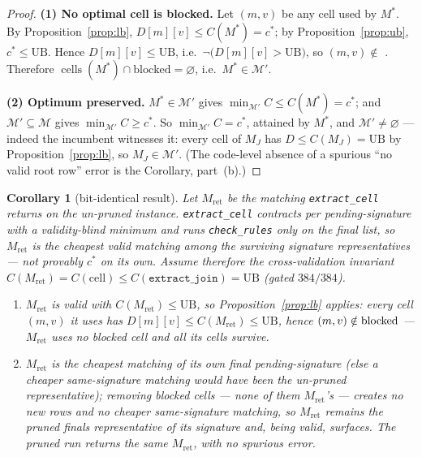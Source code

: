 \documentclass[11pt]{article}
\newtheorem{corollary}{Corollary}
\DeclareMathOperator{\cells}{cells}
\newcommand{\Mcal}{\mathcal{M}}
\newcommand{\cst}{c^{\ast}}
\newcommand{\Mst}{M^{\ast}}
\begin{document}
\begin{proof}
\textbf{(1) No optimal cell is blocked.} Let $(m,v)$ be any cell used by $\Mst$. By
Proposition~\ref{prop:lb}, $D[m][v]\le C(\Mst)=\cst$; by Proposition~\ref{prop:ub}, $\cst\le\mathrm{UB}$.
Hence $D[m][v]\le\mathrm{UB}$, i.e.\ $\neg\bigl(D[m][v]>\mathrm{UB}\bigr)$, so $(m,v)\notin$
. Therefore $\cells(\Mst)\cap\text{blocked}=\varnothing$, i.e.\ $\Mst\in\Mcal'$.

\smallskip
\textbf{(2) Optimum preserved.} $\Mst\in\Mcal'$ gives $\min_{\Mcal'}C\le C(\Mst)=\cst$; and
$\Mcal'\subseteq\Mcal$ gives $\min_{\Mcal'}C\ge\cst$. So $\min_{\Mcal'}C=\cst$, attained by $\Mst$, and
$\Mcal'\ne\varnothing$ --- indeed the incumbent witnesses it: every cell of $M_J$ has
$D\le C(M_J)=\mathrm{UB}$ by Proposition~\ref{prop:lb}, so $M_J\in\Mcal'$. (The code-level absence of a
spurious ``no valid root row'' error is the Corollary, part~(b).) \qedhere
\end{proof}

\begin{corollary}[bit-identical result]
Let $M_{\mathrm{ret}}$ be the matching \texttt{extract\_cell} returns on the un-pruned instance.
\texttt{extract\_cell} contracts per pending-signature with a \emph{validity-blind} minimum and runs
\texttt{check\_rules} only on the final list, so $M_{\mathrm{ret}}$ is the cheapest \emph{valid} matching
among the surviving signature representatives --- \emph{not} provably $\cst$ on its own. Assume therefore
the cross-validation invariant
$C(M_{\mathrm{ret}})=C(\mathrm{cell})\le C(\texttt{extract\_join})=\mathrm{UB}$ (gated $384/384$).
\begin{enumerate}[label=(\alph*),nosep]
  \item $M_{\mathrm{ret}}$ is valid with $C(M_{\mathrm{ret}})\le\mathrm{UB}$, so
        Proposition~\ref{prop:lb} applies: every cell $(m,v)$ it uses has
        $D[m][v]\le C(M_{\mathrm{ret}})\le\mathrm{UB}$, hence $(m,v)\notin\text{\normalfont blocked}$
        --- $M_{\mathrm{ret}}$ uses no blocked cell and all its cells survive.
  \item $M_{\mathrm{ret}}$ is the cheapest matching of its own final pending-signature (else a cheaper
        same-signature matching would have been the un-pruned representative); removing blocked cells ---
        none of them $M_{\mathrm{ret}}$'s --- creates no new rows and no cheaper same-signature matching,
        so $M_{\mathrm{ret}}$ remains the pruned finals representative of its signature and, being valid,
        surfaces. The pruned run returns the \emph{same} $M_{\mathrm{ret}}$, with no spurious error.
\end{enumerate}
\end{corollary}
\end{document}
